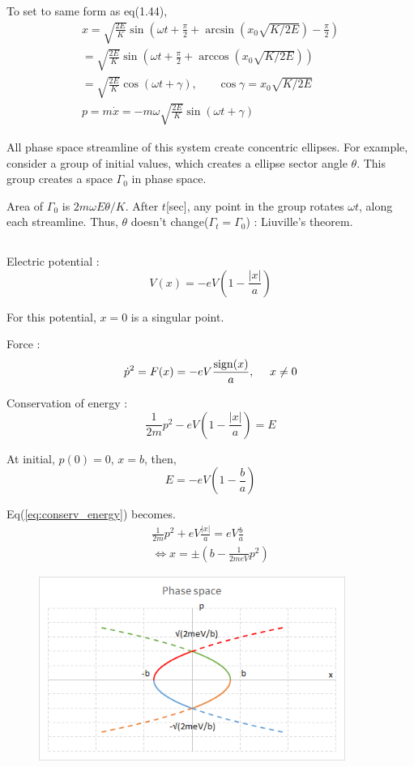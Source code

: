 \documentclass{jarticle}
\begin{document}
To set to same form as eq(1.44), 
\begin{eqnarray}
	x = \sqrt{\frac{2E}{K}}\sin\left(\omega t + \frac{\pi}{2} + \arcsin(x_0\sqrt{K/2E}) - \frac{\pi}{2}\right) \nonumber \\
	= \sqrt{\frac{2E}{K}}\sin\left(\omega t + \frac{\pi}{2} + \arccos(x_0\sqrt{K/2E})\right) \nonumber \\
	= \sqrt{\frac{2E}{K}}\cos(\omega t + \gamma), ~~~~~~~~ \cos\gamma = x_0\sqrt{K/2E} \nonumber \\
	p = m\dot{x} = -m\omega \sqrt{\frac{2E}{K}}\sin(\omega t + \gamma)
\end{eqnarray}

All phase space streamline of this system create concentric ellipses. For example, consider a group of initial values, which creates a ellipse sector angle $\theta$. This group creates a space $\Gamma_0$ in phase space. 

Area of $\Gamma_0$ is $2m\omega E\theta /K$. After $t$[sec], any point in the group rotates $\omega t$, along each streamline. Thus, $\theta$ doesn't change($\Gamma_t = \Gamma_0$) : Liuville's theorem.

\subsection{}
Electric potential : 
\[
	V(x) = -eV\left(1 - \frac{|x|}{a}\right)
\]

For this potential, $x=0$ is a singular point. 

Force : 
\begin{equation}\label{eq:equation_of_motion}
	\dot{p}^2 = F(x) = -eV\frac{{\rm sign}(x)}{a}, ~~~~ x\neq 0
\end{equation}

Conservation of energy : 
\begin{equation}\label{eq:conserv_energy}
	\frac{1}{2m}p^2 -eV\left(1-\frac{|x|}{a}\right) = E
\end{equation} 

At initial, $p(0) = 0$, $x = b$, then, 
\[
	E = -eV\left(1-\frac{b}{a}\right)
\]

Eq(\ref{eq:conserv_energy}) becomes.
\begin{eqnarray}\label{eq:phase_space_equation}
	\frac{1}{2m}p^2 + eV\frac{|x|}{a} = eV\frac{b}{a} \nonumber \\
	\Leftrightarrow x = \pm \left(b - \frac{1}{2meV}p^2 \right)
\end{eqnarray}

\begin{figure}[htbp]
	\includegraphics[width=10cm]{phase_space_plot.png}
\end{figure}
\end{document}
